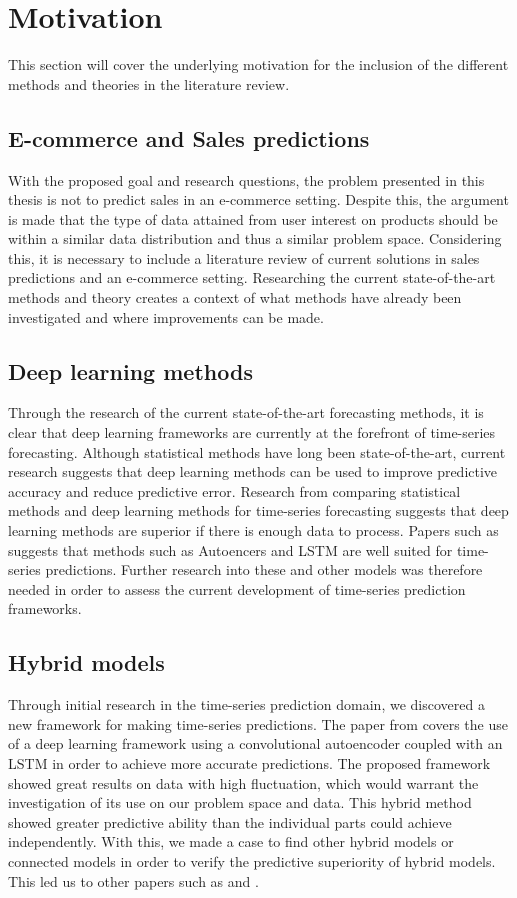 \section{Motivation}
\label{section:BT:Motivation}

This section will cover the underlying motivation for the inclusion of the different methods and theories in the literature review.


\subsection{E-commerce and Sales predictions}
With the proposed goal and research questions, the problem presented in this thesis is not to predict sales in an e-commerce setting.
Despite this, the argument is made that the type of data attained from user interest on products should be within a similar data distribution and thus a similar problem space.
Considering this, it is necessary to include a literature review of current solutions in sales predictions and an e-commerce setting.
Researching the current state-of-the-art methods and theory creates a context of what methods have already been investigated and where improvements can be made. 


\subsection{Deep learning methods}
Through the research of the current state-of-the-art forecasting methods,
it is clear that deep learning frameworks are currently at the forefront of time-series forecasting.
Although statistical methods have long been state-of-the-art, current research suggests that deep learning methods can be used to improve predictive accuracy and reduce predictive error.
Research from \cite{Makridakis2018} comparing statistical methods and deep learning methods for time-series forecasting suggests that deep learning methods are superior if there is enough data to process.
Papers such as \cite{Laptev} suggests that methods such as Autoencers and LSTM are well suited for time-series predictions.
Further research into these and other models was therefore needed in order to assess the current development of time-series prediction frameworks.


\subsection{Hybrid models}
Through initial research in the time-series prediction domain,
we discovered a new framework for making time-series predictions.
The paper from \cite{Zhao2019} covers the use of a deep learning framework using a convolutional autoencoder
coupled with an LSTM in order to achieve more accurate predictions.
The proposed framework showed great results on data with high fluctuation,
which would warrant the investigation of its use on our problem space and data.
This hybrid method showed greater predictive ability than the individual parts could achieve independently.
With this, we made a case to find other hybrid models or connected models in order to verify the predictive superiority of hybrid models.
This led us to other papers such as \cite{Khan2020} and \cite{Bowen2020}.


